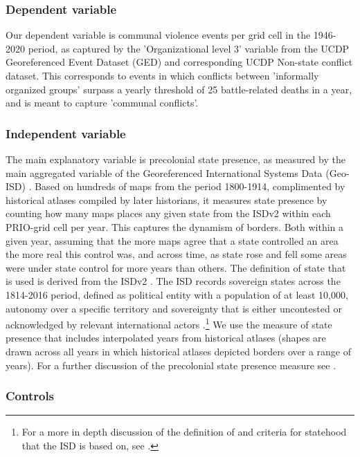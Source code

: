 \documentclass[12pt]{article}
\begin{document}
\subsubsection{Dependent variable}

Our dependent variable is communal violence events per grid cell in the
1946-2020 period, as captured by the 'Organizational level 3' variable from the
UCDP Georeferenced Event Dataset (GED) and corresponding UCDP Non-state conflict
dataset. This corresponds to events in which conflicts between 'informally
organized groups' surpass a yearly threshold of 25 battle-related deaths in a
year, and is meant to capture 'communal conflicts'.

\subsubsection{Independent variable}

The main explanatory variable is precolonial state presence, as measured by the
main aggregated variable of the Georeferenced International Systems Data
(Geo-ISD) \citep{Wishman2021}. Based on hundreds of maps from the period
1800-1914, complimented by historical atlases compiled by later historians, it
measures state presence by counting how many maps places any given state from
the ISDv2 within each PRIO-grid cell per year.  This captures the dynamism of
borders. Both within a given year, assuming that the more maps agree that a
state controlled an area the more real this control was, and across time, as
state rose and fell some areas were under state control for more years than
others. The definition of state that is used is derived from the ISDv2
\citep{Butcher2020}. The ISD records sovereign states across the 1814-2016
period, defined as political entity with a population of at least 10,000,
autonomy over a specific territory and sovereignty that is either uncontested or
acknowledged by relevant international actors \citep{Butcher2020}.\footnote{For
a more in depth discussion of the definition of and criteria for statehood that
the ISD is based on, see \citet{Butcher2017}.} We use the measure of state
presence that includes interpolated years from historical atlases (shapes are
drawn across all years in which historical atlases depicted borders over a range
of years). For a further discussion of the precolonial state presence measure
see \citet{Wishman2021}. 

\subsubsection{Controls}
\end{document}

